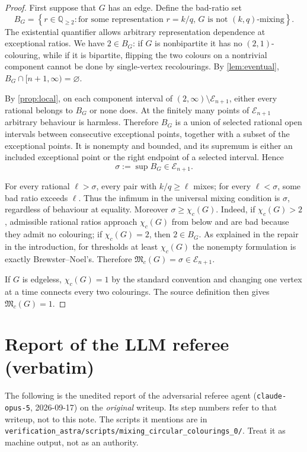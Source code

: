 \documentclass[11pt,a4paper]{article}
\theoremstyle{plain}
\theoremstyle{definition}
\theoremstyle{remark}
\newcommand{\Q}{\mathbb Q}
\newcommand{\Mc}{\mathfrak M_c}
\newcommand{\cE}{\mathcal E}
\newcommand{\chic}{\chi_c}
\begin{document}
\label{pf:main}
\thmmain*
\begin{proof}
First suppose that $G$ has an edge.  Define the bad-ratio set
\[
 B_G=\left\{r\in\Q_{\ge2}:\text{for some representation $r=k/q$, $G$ is not
 $(k,q)$-mixing}\right\}.
\]
The existential quantifier allows arbitrary representation dependence at exceptional
ratios.  We have $2\in B_G$: if $G$ is nonbipartite it has no $(2,1)$-colouring, while
if it is bipartite, flipping the two colours on a nontrivial component cannot be done by
single-vertex recolourings.  By \cref{lem:eventual}, $B_G\cap[n+1,\infty)=\varnothing$.

By \cref{prop:local}, on each component interval of
$(2,\infty)\setminus\cE_{n+1}$, either every rational belongs to $B_G$ or none does.
At the finitely many points of $\cE_{n+1}$ arbitrary behaviour is harmless.  Therefore
$B_G$ is a union of selected rational open intervals between consecutive exceptional
points, together with a subset of the exceptional points.  It is nonempty and bounded,
and its supremum is either an included exceptional point or the right endpoint of a
selected interval.  Hence
\[
 \sigma:=\sup B_G\in\cE_{n+1}.
\]

For every rational $\ell>\sigma$, every pair with $k/q\ge\ell$ mixes; for every
$\ell<\sigma$, some bad ratio exceeds $\ell$.  Thus the infimum in the universal
mixing condition is $\sigma$, regardless of behaviour at equality.  Moreover
$\sigma\ge\chic(G)$.  Indeed, if $\chic(G)>2$, admissible rational ratios approach
$\chic(G)$ from below and are bad because they admit no colouring; if
$\chic(G)=2$, then $2\in B_G$.  As explained in the repair in the introduction, for
thresholds at least $\chic(G)$ the nonempty formulation is exactly Brewster--Noel's.
Therefore $\Mc(G)=\sigma\in\cE_{n+1}$.

If $G$ is edgeless, $\chic(G)=1$ by the standard convention and changing one vertex at
a time connects every two colourings.  The source definition then gives $\Mc(G)=1$.
\end{proof}

\section{Report of the LLM referee (verbatim)}\label{app:referee}

\begin{tcolorbox}[colback=gray!8,colframe=gray!50,boxrule=0.4pt,arc=2pt]
\small The following is the unedited report of the adversarial referee agent
(\texttt{claude-opus-5}, 2026-09-17) on the \emph{original} writeup. Its step numbers
refer to that writeup, not to this note. The scripts it mentions are in
\texttt{verification\_astra/scripts/mixing\_circular\_colourings\_0/}. Treat it as
machine output, not as an authority.
\end{tcolorbox}
\end{document}
